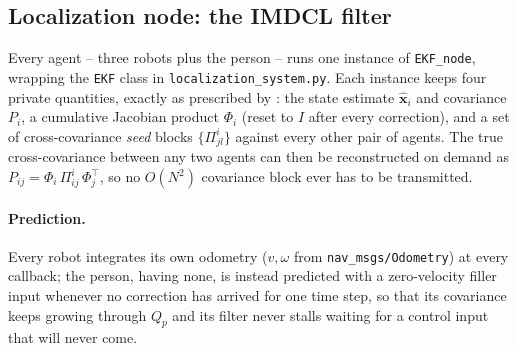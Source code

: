 \documentclass[10pt,conference]{IEEEtran}
\begin{document}
\subsection{Localization node: the IMDCL filter}
\label{sec:localization-node}

Every agent -- three robots plus the person -- runs one instance of \texttt{EKF\_node}, wrapping
the \texttt{EKF} class in \texttt{localization\_system.py}. Each instance keeps four private
quantities, exactly as prescribed by \cite{kia2016}: the state estimate $\hat{\mathbf{x}}_i$ and
covariance $P_i$, a cumulative Jacobian product $\Phi_i$ (reset to $I$ after every correction),
and a set of cross-covariance \emph{seed} blocks $\{\Pi^i_{jl}\}$ against every other pair of
agents. The true cross-covariance between any two agents can then be reconstructed on demand as
$P_{ij}=\Phi_i\,\Pi^i_{ij}\,\Phi_j^\top$, so no $O(N^2)$ covariance block ever has to be
transmitted.

\paragraph{Prediction.} Every robot integrates its own odometry ($v,\omega$ from
\texttt{nav\_msgs/Odometry}) at every callback; the person, having none, is instead predicted with
a zero-velocity filler input whenever no correction has arrived for one time step, so that its
covariance keeps growing through $Q_p$ and its filter never stalls waiting for a control input
that will never come.
\end{document}
